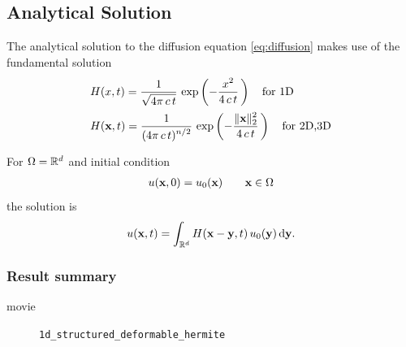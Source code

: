 \subsection{Analytical Solution}
The analytical solution to the diffusion equation \eqref{eq:diffusion} makes use of the fundamental solution
\begin{equation*}
  \begin{array}{lll}
    H(x,t) = \displaystyle\frac{\displaystyle{1}}{\displaystyle{\sqrt{4\pi\,c\,t}}}\,\exp\left(-\displaystyle\frac{\displaystyle{x^2}}{\displaystyle{4\,c\,t}}\,\right) \quad \text{for 1D}\\[4mm]
    H(\textbf{x},t) = \displaystyle\frac{\displaystyle{1}}{\displaystyle{(4\pi\,c\,t)^{n/2}}}\,\exp\left(-\displaystyle\frac{\displaystyle{\Vert \textbf{x}\Vert_2^2}}{\displaystyle{4\,c\,t}}\,\right) \quad \text{for 2D,3D}\\[4mm]
  \end{array}
\end{equation*}
For $\Omega=\mathbb{R}^d$ and initial condition
\begin{equation*}
  \begin{array}{lll}
    u(\textbf{x},0) = u_0(\textbf{x})\qquad \textbf{x} \in \Omega
  \end{array}
\end{equation*}
the solution is
\begin{equation*}
  \begin{array}{lll}
    u(\bfx,t) = \ds\int_{\R^d} H(\bfx - \bfy,t)\,u_0(\bfy)\,\d \bfy.
  \end{array}
\end{equation*}

\subsubsection{Result summary}
%
%
\begin{frame}{movie}
  \begin{figure}[h!]
    \centering    
    \caption{\lstinline{1d_structured_deformable_hermite}}
  \end{figure} 
\end{frame}

